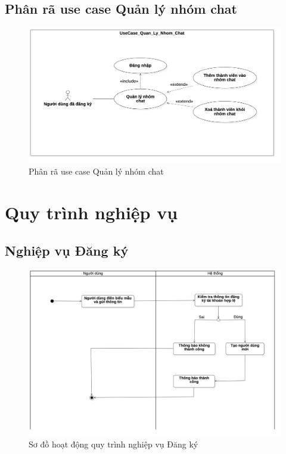 \documentclass[../DoAn.tex]{subfiles}
\begin{document}
\subsection{Phân rã use case Quản lý nhóm chat}
\begin{figure}[H]
    \centering
    \includegraphics[width=1\linewidth]{Hinhve/UseCase/UseCase_Quan_Ly_Nhom_Chat.png}
    \caption{Phân rã use case Quản lý nhóm chat}
    \label{fig:use_case_binh_luan_task}
\end{figure}     



\section{Quy trình nghiệp vụ}
\label{subsection:2.3}

\subsection{Nghiệp vụ Đăng ký}
\begin{figure}[H]
   \centering
    \includegraphics[width=1\linewidth]{Hinhve/Activity/Activity_Dang_Ky.png}
    \caption{Sơ đồ hoạt động quy trình nghiệp vụ Đăng ký}
    \label{fig:dang_nhap}
\end{figure}
\end{document}
